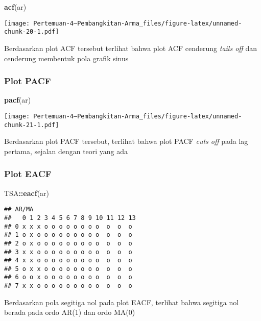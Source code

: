 \documentclass[
]{article}
\newenvironment{Shaded}{\begin{snugshade}}{\end{snugshade}}
\newcommand{\FunctionTok}[1]{\textcolor[rgb]{0.13,0.29,0.53}{\textbf{#1}}}
\newcommand{\NormalTok}[1]{#1}
\newcommand{\SpecialCharTok}[1]{\textcolor[rgb]{0.81,0.36,0.00}{\textbf{#1}}}
\begin{document}
\begin{Shaded}
\begin{Highlighting}[]
\FunctionTok{acf}\NormalTok{(ar)}
\end{Highlighting}
\end{Shaded}

\texttt{[image: Pertemuan-4---Pembangkitan-Arma\_files/figure-latex/unnamed-chunk-20-1.pdf]}

Berdasarkan plot ACF tersebut terlihat bahwa plot ACF cenderung
\emph{tails off} dan cenderung membentuk pola grafik sinus

\subsubsection{Plot PACF}\label{plot-pacf-1}

\begin{Shaded}
\begin{Highlighting}[]
\FunctionTok{pacf}\NormalTok{(ar)}
\end{Highlighting}
\end{Shaded}

\texttt{[image: Pertemuan-4---Pembangkitan-Arma\_files/figure-latex/unnamed-chunk-21-1.pdf]}

Berdasarkan plot PACF tersebut, terlihat bahwa plot PACF \emph{cuts off}
pada lag pertama, sejalan dengan teori yang ada

\subsubsection{Plot EACF}\label{plot-eacf-1}

\begin{Shaded}
\begin{Highlighting}[]
\NormalTok{TSA}\SpecialCharTok{::}\FunctionTok{eacf}\NormalTok{(ar)}
\end{Highlighting}
\end{Shaded}

\begin{verbatim}
## AR/MA
##   0 1 2 3 4 5 6 7 8 9 10 11 12 13
## 0 x x x o o o o o o o o  o  o  o 
## 1 o x o o o o o o o o o  o  o  o 
## 2 o x o o o o o o o o o  o  o  o 
## 3 x x o o o o o o o o o  o  o  o 
## 4 x x o o o o o o o o o  o  o  o 
## 5 o x x o o o o o o o o  o  o  o 
## 6 o o x o o o o o o o o  o  o  o 
## 7 x x o o o o o o o o o  o  o  o
\end{verbatim}

Berdasarkan pola segitiga nol pada plot EACF, terlihat bahwa segitiga
nol berada pada ordo AR(1) dan ordo MA(0)
\end{document}
